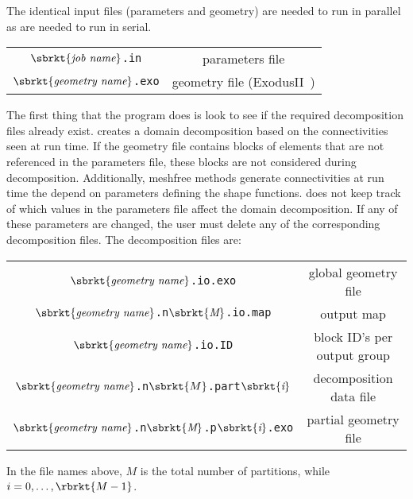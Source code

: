 The identical input files (parameters and geometry) are needed to run in
parallel as are needed to run in serial.
\begin{center}
\begin{tabular}[c]{c c}
 \parbox[b]{3.0in}{\raggedleft $\sbrkt{\textit{job name}}$\texttt{.in}}
&\parbox[b]{3.0in}{parameters file}\\
 \parbox[b]{3.0in}{\raggedleft $\sbrkt{\textit{geometry name}}$\texttt{.exo}}
&\parbox[b]{3.0in}{geometry file (\textsf{ExodusII}~\cite{ExodusII})}\\
\end{tabular}
\end{center}
The first thing that the program does is look to see if the required
decomposition files already exist.  \tahoe creates a domain decomposition
based on the connectivities seen at run time.  If the geometry file
contains blocks of elements that are not referenced in the parameters file,
these blocks are not considered during decomposition.  Additionally,
meshfree methods generate connectivities at run time the depend on
parameters defining the shape functions.  \tahoe does not keep track of
which values in the parameters file affect the domain decomposition.  If
any of these parameters are changed, the user must delete any of the
corresponding decomposition files.  The decomposition files are:
\begin{center}
\begin{tabular}[c]{c c}
 \parbox[b]{3.0in}{\raggedleft $\sbrkt{\textit{geometry name}}$\texttt{.io.exo}}
&\parbox[b]{3.0in}{global geometry file}\\
 \parbox[b]{3.0in}{\raggedleft $\sbrkt{\textit{geometry name}}$\texttt{.n}$\sbrkt{\textit{M}}$\texttt{.io.map}}
&\parbox[b]{3.0in}{output map}\\
 \parbox[b]{3.0in}{\raggedleft $\sbrkt{\textit{geometry name}}$\texttt{.io.ID}}
&\parbox[b]{3.0in}{block ID's per output group}\\
 \parbox[b]{3.0in}{\raggedleft $\sbrkt{\textit{geometry name}}$\texttt{.n}$\sbrkt{{M}}$\texttt{.part}$\sbrkt{\textit{i}}$}
&\parbox[b]{3.0in}{decomposition data file}\\
 \parbox[b]{3.0in}{\raggedleft $\sbrkt{\textit{geometry name}}$\texttt{.n}$\sbrkt{\textit{M}}$\texttt{.p}$\sbrkt{\textit{i}}$\texttt{.exo}}
&\parbox[b]{3.0in}{partial geometry file}
\end{tabular}
\end{center}
In the file names above, $M$ is the total number of partitions, 
while $i = 0,\ldots,\rbrkt{M - 1}$.
